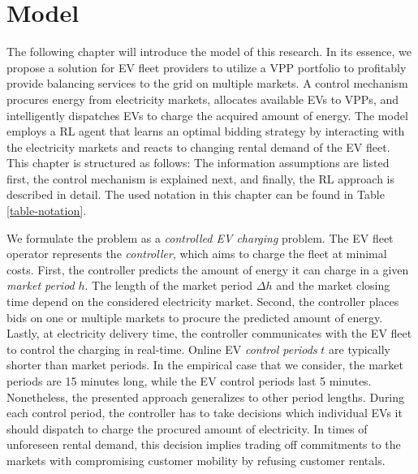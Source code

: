\documentclass[a4paper, 12pt]{article}
\begin{document}
\clearpage

\section{Model}
\label{sec:org0bdc9b6}
The following chapter will introduce the model of this research. In its essence,
we propose a solution for EV fleet providers to utilize a VPP portfolio to
profitably provide balancing services to the grid on multiple markets. A control
mechanism procures energy from electricity markets, allocates available EVs to
VPPs, and intelligently dispatches EVs to charge the acquired amount of energy.
The model employs a RL agent that learns an optimal bidding strategy by
interacting with the electricity markets and reacts to changing rental demand of
the EV fleet. This chapter is structured as follows: The information assumptions
are listed first, the control mechanism is explained next, and finally, the RL
approach is described in detail. The used notation in this chapter can be found
in Table \ref{table-notation}.

We formulate the problem as a \emph{controlled EV charging} problem. The EV fleet
operator represents the \emph{controller}, which aims to charge the fleet at minimal
costs. First, the controller predicts the amount of energy it can charge in a
given \emph{market period} \(h\). The length of the market period \(\Delta h\) and the
market closing time depend on the considered electricity market. Second, the
controller places bids on one or multiple markets to procure the predicted
amount of energy. Lastly, at electricity delivery time, the controller
communicates with the EV fleet to control the charging in real-time. Online EV
\emph{control periods} \(t\) are typically shorter than market periods. In the
empirical case that we consider, the market periods are 15 minutes long, while
the EV control periods last 5 minutes. Nonetheless, the presented approach
generalizes to other period lengths. During each control period, the controller
has to take decisions which individual EVs it should dispatch to charge the
procured amount of electricity. In times of unforeseen rental demand, this
decision implies trading off commitments to the markets with compromising
customer mobility by refusing customer rentals.
\end{document}
